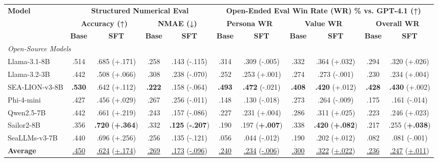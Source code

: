 \begin{tabular}{l|cc|cc|cc|cc|cc}
\toprule
\multirow{3}{*}{\textbf{Model}} & \multicolumn{4}{c|}{\textbf{Structured Numerical Eval}} & \multicolumn{6}{c}{\textbf{Open-Ended Eval Win Rate (WR) \% vs. GPT-4.1 (↑)}} \\
\cmidrule(lr){2-5} \cmidrule(lr){6-11}
& \multicolumn{2}{c|}{\textbf{Accuracy (↑)}} & \multicolumn{2}{c|}{\textbf{NMAE (↓)}} & \multicolumn{2}{c|}{\textbf{Persona WR}} & \multicolumn{2}{c|}{\textbf{Value WR}} & \multicolumn{2}{c}{\textbf{Overall WR}} \\
& \textbf{Base} & \textbf{SFT} & \textbf{Base} & \textbf{SFT} & \textbf{Base} & \textbf{SFT} & \textbf{Base} & \textbf{SFT} & \textbf{Base} & \textbf{SFT} \\
\midrule
\multicolumn{11}{l}{\textit{Open-Source Models}} \\
\midrule
Llama-3.1-8B \citeyearpar{IntroducingLlama312024} & .514 & .685 (+.171) & .258 & .143 (-.115) & .314 & .309 (-.005) & .332 & .364 (+.032) & .294 & .320 (+.026) \\
Llama-3.2-3B \citeyearpar{Llama32Revolutionizing2024a} & .442 & .508 (+.066) & .308 & .238 (-.070) & .252 & .253 (+.001) & .274 & .273 (-.001) & .230 & .234 (+.004) \\
SEA-LION-v3-8B \citeyearpar{ngSEALIONSoutheastAsian2025} & \textbf{.530} & .642 (+.112) & \textbf{.222} & .158 (-.064) & \textbf{.493} & \textbf{.472} (-.021) & \textbf{.408} & \textbf{.420} (+.012) & \textbf{.428} & \textbf{.430} (+.002) \\
Phi-4-mini \citeyearpar{microsoftPhi4miniTechnicalReport2025} & .427 & .456 (+.029) & .267 & .256 (-.011) & .148 & .130 (-.018) & .273 & .264 (-.009) & .175 & .161 (-.014) \\
Qwen2.5-7B \citeyearpar{qwenQwen25TechnicalReport2025} & .442 & .661 (+.219) & .243 & .157 (-.086) & .227 & .231 (+.004) & .286 & .311 (+.025) & .223 & .246 (+.023) \\
Sailor2-8B \citeyearpar{douSailor2SailingSoutheast2025} & .356 & \textbf{.720} (\textbf{+.364}) & .332 & \textbf{.125} (\textbf{-.207}) & .190 & .197 (\textbf{+.007}) & .338 & \textbf{.420} (\textbf{+.082}) & .217 & .255 (\textbf{+.038}) \\
SeaLLMs-v3-7B \citeyearpar{zhangSeaLLMs3Open2025} & .440 & .696 (+.256) & .256 & .135 (-.121) & .056 & .044 (-.012) & .190 & .202 (+.012) & .082 & .081 (-.001) \\
\midrule
\textbf{Average} & \underline{.450} & \underline{.624} (\underline{+.174}) & \underline{.269} & \underline{.173} (\underline{-.096}) & \underline{.240} & \underline{.234} (\underline{-.006}) & \underline{.300} & \underline{.322} (\underline{+.022}) & \underline{.236} & \underline{.247} (\underline{+.011}) \\

\end{tabular}
